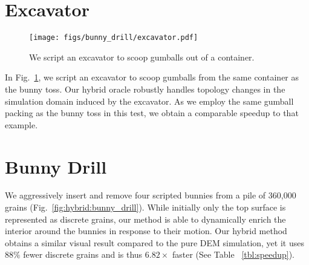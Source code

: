 \section{Excavator}
\begin{figure}
\centering
  \texttt{[image: figs/bunny\_drill/excavator.pdf]}
  \caption{We script an excavator to scoop gumballs out of a container.}
  \label{fig:hybrid:excavator}
\end{figure}

In Fig.~\ref{fig:hybrid:excavator}, we script an excavator to scoop gumballs from the same container as the bunny toss. Our hybrid oracle robustly handles topology changes in the simulation domain induced by the excavator. As we employ the same gumball packing as the bunny toss in this test, we obtain a comparable speedup to that example.


\section{Bunny Drill}
We aggressively insert and remove four scripted bunnies from a pile of 360,000 grains (Fig.~\ref{fig:hybrid:bunny_drill}). While initially only the top surface is represented as discrete grains, our method is able to dynamically enrich the interior around the bunnies in response to their motion. Our hybrid method obtains a similar visual result compared to the pure DEM simulation, yet it uses $88\%$ fewer discrete grains and is thus $6.82\times$ faster (See Table ~\ref{tbl:speedup}).

